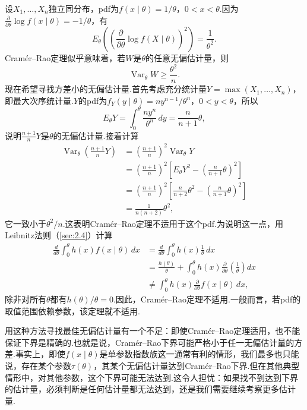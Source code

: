 \begin{example}[尺度均匀分布的无偏估计量]\label{ex:7.3.13}
设$X_1,\ldots,X_n$独立同分布，pdf为$f(x\mid\theta)=1/\theta$，$0<x<\theta$.因为$\frac\partial{\partial\theta}\log f(x\mid\theta)=-1/\theta$，有
$$E_\theta\left(\left(\frac\partial{\partial\theta}\log f(X\mid\theta)\right)^2\right)=\frac1{\theta^2}.$$
Cramér--Rao定理似乎意味着，若$W$是$\theta$的任意无偏估计量，则
$$\operatorname{Var}_\theta W\ge\frac{\theta^2}n.$$
现在希望寻找方差小的无偏估计量.首先考虑充分统计量$Y=\max(X_1,\ldots,X_n)$，即最大次序统计量.$Y$的pdf为$f_Y(y\mid\theta)=ny^{n-1}/\theta^n$，$0<y<\theta$，所以
$$E_\theta Y=\int_0^\theta\frac{ny^n}{\theta^n}\,dy=\frac n{n+1}\theta,$$
说明$\frac{n+1}nY$是$\theta$的无偏估计量.接着计算
\begin{align*}
\operatorname{Var}_\theta\left(\frac{n+1}nY\right)&=\left(\frac{n+1}n\right)^2\operatorname{Var}_\theta Y\\
&=\left(\frac{n+1}n\right)^2\left[E_\theta Y^2-\left(\frac n{n+1}\theta\right)^2\right]\\
&=\left(\frac{n+1}n\right)^2\left[\frac n{n+2}\theta^2-\left(\frac n{n+1}\theta\right)^2\right]\\
&=\frac1{n(n+2)}\theta^2,
\end{align*}
它一致小于$\theta^2/n$.这表明Cramér--Rao定理不适用于这个pdf.为说明这一点，用Leibnitz法则（\autoref{sec:2.4}）计算
\begin{align*}
\frac d{d\theta}\int_0^\theta h(x)f(x\mid\theta)\,dx
&=\frac d{d\theta}\int_0^\theta h(x)\frac1\theta\,dx\\
&=\frac{h(\theta)}\theta+\int_0^\theta h(x)\frac\partial{\partial\theta}\left(\frac1\theta\right)dx\\
&\ne\int_0^\theta h(x)\frac\partial{\partial\theta}f(x\mid\theta)\,dx,
\end{align*}
除非对所有$\theta$都有$h(\theta)/\theta=0$.因此，Cramér--Rao定理不适用.一般而言，若pdf的取值范围依赖参数，该定理就不适用.
\end{example}
用这种方法寻找最佳无偏估计量有一个不足：即使Cramér--Rao定理适用，也不能保证下界是精确的.也就是说，Cramér--Rao下界可能严格小于任一无偏估计量的方差.事实上，即使$f(x\mid\theta)$是单参数指数族这一通常有利的情形，我们最多也只能说，存在某个参数$\tau(\theta)$，其某个无偏估计量达到Cramér--Rao下界.但在其他典型情形中，对其他参数，这个下界可能无法达到.这令人担忧：如果找不到达到下界的估计量，必须判断是任何估计量都无法达到，还是我们需要继续考察更多估计量.
